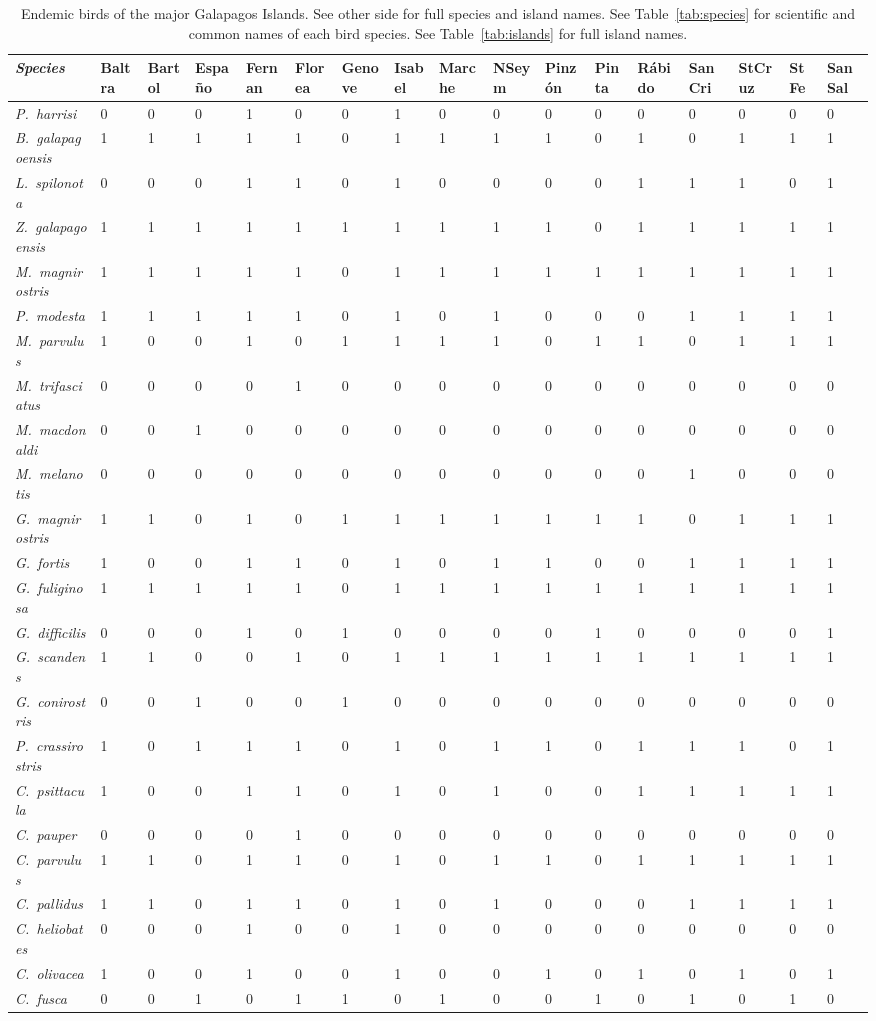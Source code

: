 \documentclass[11pt]{article}
\begin{document}
\begin{landscape}


{\fontsize{10pt}{12pt}\selectfont
	
\begin{longtable}[l]{>{\em}lllllllllllllllll}
\caption{Endemic birds of the major Galapagos Islands. See other side for full species and island names. See Table~\ref{tab:species} for scientific and common names of each bird species.  See Table~\ref{tab:islands} for full island names.}\label{tab:endemic}\tabularnewline
\toprule
\textup{Species} & Baltra & Bartol & Españo & Fernan & Florea & Genove & Isabel & Marche & NSeym & Pinzón & Pinta & Rábido & SanCri & StCruz & StFe & SanSal \tabularnewline
\midrule
P.~harrisi & 0 & 0 & 0 & 1 & 0 & 0 & 1 & 0 & 0 & 0 & 0 & 0 & 0 & 0 & 0 & 0\tabularnewline
B.~galapagoensis & 1 & 1 & 1 & 1 & 1 & 0 & 1 & 1 & 1 & 1 & 0 & 1 & 0 & 1 & 1 & 1\tabularnewline
L.~spilonota & 0 & 0 & 0 & 1 & 1 & 0 & 1 & 0 & 0 & 0 & 0 & 1 & 1 & 1 & 0 & 1\tabularnewline
Z.~galapagoensis & 1 & 1 & 1 & 1 & 1 & 1 & 1 & 1 & 1 & 1 & 0 & 1 & 1 & 1 & 1 & 1\tabularnewline
M.~magnirostris & 1 & 1 & 1 & 1 & 1 & 0 & 1 & 1 & 1 & 1 & 1 & 1 & 1 & 1 & 1 & 1\tabularnewline
P.~modesta & 1 & 1 & 1 & 1 & 1 & 0 & 1 & 0 & 1 & 0 & 0 & 0 & 1 & 1 & 1 & 1\tabularnewline
M.~parvulus & 1 & 0 & 0 & 1 & 0 & 1 & 1 & 1 & 1 & 0 & 1 & 1 & 0 & 1 & 1 & 1\tabularnewline
M.~trifasciatus & 0 & 0 & 0 & 0 & 1 & 0 & 0 & 0 & 0 & 0 & 0 & 0 & 0 & 0 & 0 & 0\tabularnewline
M.~macdonaldi & 0 & 0 & 1 & 0 & 0 & 0 & 0 & 0 & 0 & 0 & 0 & 0 & 0 & 0 & 0 & 0\tabularnewline
M.~melanotis & 0 & 0 & 0 & 0 & 0 & 0 & 0 & 0 & 0 & 0 & 0 & 0 & 1 & 0 & 0 & 0\tabularnewline
G.~magnirostris & 1 & 1 & 0 & 1 & 0 & 1 & 1 & 1 & 1 & 1 & 1 & 1 & 0 & 1 & 1 & 1\tabularnewline
G.~fortis & 1 & 0 & 0 & 1 & 1 & 0 & 1 & 0 & 1 & 1 & 0 & 0 & 1 & 1 & 1 & 1\tabularnewline
G.~fuliginosa & 1 & 1 & 1 & 1 & 1 & 0 & 1 & 1 & 1 & 1 & 1 & 1 & 1 & 1 & 1 & 1\tabularnewline
G.~difficilis & 0 & 0 & 0 & 1 & 0 & 1 & 0 & 0 & 0 & 0 & 1 & 0 & 0 & 0 & 0 & 1\tabularnewline
G.~scandens & 1 & 1 & 0 & 0 & 1 & 0 & 1 & 1 & 1 & 1 & 1 & 1 & 1 & 1 & 1 & 1\tabularnewline
G.~conirostris & 0 & 0 & 1 & 0 & 0 & 1 & 0 & 0 & 0 & 0 & 0 & 0 & 0 & 0 & 0 & 0\tabularnewline
P.~crassirostris & 1 & 0 & 1 & 1 & 1 & 0 & 1 & 0 & 1 & 1 & 0 & 1 & 1 & 1 & 0 & 1\tabularnewline
C.~psittacula & 1 & 0 & 0 & 1 & 1 & 0 & 1 & 0 & 1 & 0 & 0 & 1 & 1 & 1 & 1 & 1\tabularnewline
C.~pauper & 0 & 0 & 0 & 0 & 1 & 0 & 0 & 0 & 0 & 0 & 0 & 0 & 0 & 0 & 0 & 0\tabularnewline
C.~parvulus & 1 & 1 & 0 & 1 & 1 & 0 & 1 & 0 & 1 & 1 & 0 & 1 & 1 & 1 & 1 & 1\tabularnewline
C.~pallidus & 1 & 1 & 0 & 1 & 1 & 0 & 1 & 0 & 1 & 0 & 0 & 0 & 1 & 1 & 1 & 1\tabularnewline
C.~heliobates & 0 & 0 & 0 & 1 & 0 & 0 & 1 & 0 & 0 & 0 & 0 & 0 & 0 & 0 & 0 & 0\tabularnewline
C.~olivacea & 1 & 0 & 0 & 1 & 0 & 0 & 1 & 0 & 0 & 1 & 0 & 1 & 0 & 1 & 0 & 1\tabularnewline
C.~fusca & 0 & 0 & 1 & 0 & 1 & 1 & 0 & 1 & 0 & 0 & 1 & 0 & 1 & 0 & 1 & 0\tabularnewline
\bottomrule
\end{longtable}
}

\end{landscape}
\end{document}
